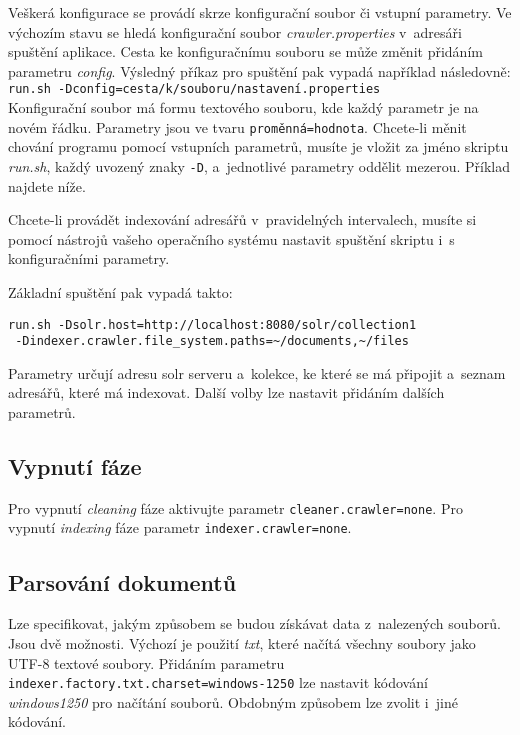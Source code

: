 Veškerá konfigurace se provádí skrze konfigurační soubor či vstupní parametry. Ve výchozím stavu se hledá konfigurační soubor \emph{crawler.properties} v~adresáři spuštění aplikace. Cesta ke konfiguračnímu souboru se může změnit přidáním parametru \emph{config}. Výsledný příkaz pro spuštění pak vypadá například následovně: \\ \verb|run.sh -Dconfig=cesta/k/souboru/nastavení.properties| \\

Konfigurační soubor má formu textového souboru, kde každý parametr je na novém řádku. Parametry jsou ve tvaru \verb|proměnná=hodnota|. Chcete-li měnit chování programu pomocí vstupních parametrů, musíte je vložit za jméno skriptu \emph{run.sh}, každý uvozený znaky \verb|-D|, a~jednotlivé parametry oddělit mezerou. Příklad najdete níže.
 
Chcete-li provádět indexování adresářů v~pravidelných intervalech, musíte si pomocí nástrojů vašeho operačního systému nastavit spuštění skriptu i~s konfiguračními parametry. 

Základní spuštění pak vypadá takto:
\begin{verbatim}
run.sh -Dsolr.host=http://localhost:8080/solr/collection1 
 -Dindexer.crawler.file_system.paths=~/documents,~/files
\end{verbatim}
Parametry určují adresu solr serveru a~kolekce, ke které se má připojit a~seznam adresářů, které má indexovat. Další volby lze nastavit přidáním dalších parametrů.

\subsection{Vypnutí fáze}
Pro vypnutí \emph{cleaning} fáze aktivujte parametr \verb|cleaner.crawler=none|. Pro vypnutí \emph{indexing} fáze parametr \verb|indexer.crawler=none|.

\subsection{Parsování dokumentů}
Lze specifikovat, jakým způsobem se budou získávat data z~nalezených souborů. Jsou dvě možnosti. Výchozí je použití \emph{txt}, které načítá všechny soubory jako UTF-8 textové soubory. Přidáním parametru \\\verb|indexer.factory.txt.charset=windows-1250| lze nastavit kódování \\ \emph{windows1250} pro načítání souborů. Obdobným způsobem lze zvolit i~jiné kódování.

